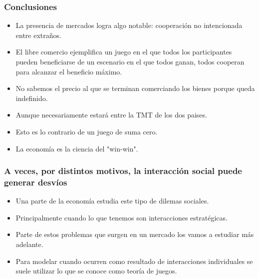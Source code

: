 \documentclass{beamer}
\begin{document}
\begin{frame}
    \frametitle{Conclusiones}
    \begin{itemize}
        \item La presencia de mercados logra algo notable: cooperación no intencionada entre extraños.
        \item El libre comercio ejemplifica un juego en el que todos los participantes pueden beneficiarse de un escenario en el que todos ganan, todos cooperan para alcanzar el beneficio máximo.
        \item No sabemos el precio al que se terminan comerciando los bienes porque queda indefinido.
        \item Aunque necesariamente estará entre la TMT de los dos paises.
        \item Esto es lo contrario de un juego de suma cero.
        \item La economía es la ciencia del "win-win".
    \end{itemize}
\end{frame}

\begin{frame}
    \frametitle{A veces, por distintos motivos, la interacción social puede generar desvíos}
    \begin{itemize}
        \item Una parte de la economía estudia este tipo de dilemas sociales.
        \item Principalmente cuando lo que tenemos son interacciones estratégicas.
        \item Parte de estos problemas que surgen en un mercado los vamos a estudiar más adelante.
        \item Para modelar cuando ocurren como resultado de interacciones individuales se suele utilizar lo que se conoce como teoría de juegos.
    \end{itemize}
\end{frame}
\end{document}
